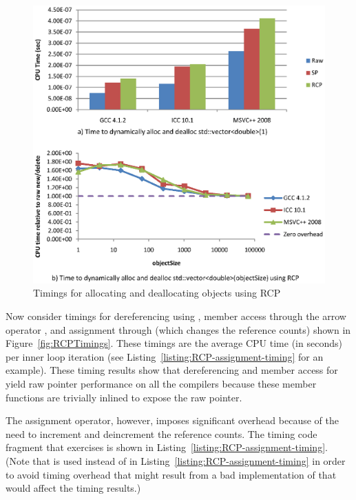 \documentclass[pdf,ps2pdf,11pt]{SANDreport}
\begin{document}
{\bsinglespace
\begin{figure}
\begin{center}
\includegraphics*[angle=0,scale=1.00]{RCPAllocTimings}
\end{center}
\caption{
\label{fig:RCPAllocTimings}
Timings for allocating and deallocating objects using RCP}
\end{figure}
\esinglespace}


Now consider timings for dereferencing using {},
member access through the arrow operator {},
and assignment through {} (which changes the
reference counts) shown in Figure~\ref{fig:RCPTimings}.  These
timings are the average CPU time (in seconds) per inner loop iteration
(see Listing~\ref{listing:RCP-assignment-timing} for an example).
These timing results show that dereferencing and member access for
{} yield raw pointer performance on all the compilers because
these member functions are trivially inlined to expose the raw
pointer.

The assignment operator, however, imposes significant overhead because
of the need to increment and deincrement the reference counts.  The
timing code fragment that exercises {} is
shown in Listing~\ref{listing:RCP-assignment-timing}.  (Note that
{} is used instead of {} in
Listing~\ref{listing:RCP-assignment-timing} in order to avoid timing
overhead that might result from a bad implementation of
{} that would affect the timing results.)
\end{document}
